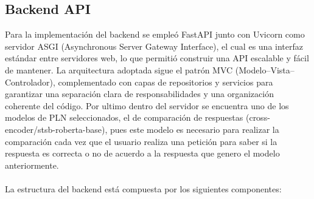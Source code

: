 \subsection{Backend API}

Para la implementación del backend se empleó FastAPI junto con Uvicorn como servidor ASGI (Asynchronous Server Gateway Interface), el cual es una interfaz estándar entre servidores web, lo que permitió construir una API escalable y fácil de mantener. La arquitectura adoptada sigue el patrón MVC (Modelo–Vista–Controlador), complementado con capas de repositorios y servicios para garantizar una separación clara de responsabilidades y una organización coherente del código. Por ultimo dentro del servidor se encuentra uno de los modelos de PLN seleccionados, el de comparación de respuestas (cross-encoder/stsb-roberta-base), pues este modelo es necesario para realizar la comparación cada vez que el usuario realiza una petición para saber si la respuesta es correcta o no de acuerdo a la respuesta que genero el modelo anteriormente.
\\
\\
La estructura del backend está compuesta por los siguientes componentes:

